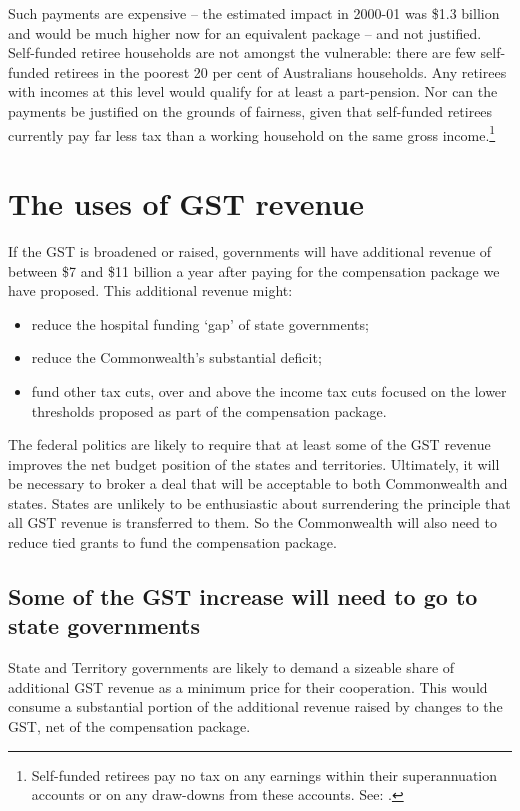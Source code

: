 \documentclass{grattanAlpha}
\begin{document}
Such payments are expensive – the estimated impact in 2000-01 was \$1.3 billion and would be much higher now for an equivalent package – and not justified. Self-funded retiree households are not amongst the vulnerable: there are few self-funded retirees in the poorest 20 per cent of Australians households. Any retirees with incomes at this level would qualify for at least a part-pension. Nor can the payments be justified on the grounds of fairness, given that self-funded retirees currently pay far less tax than a working household on the same gross income.\footnote{Self-funded retirees pay no tax on any earnings within their superannuation accounts or on any draw-downs from these accounts. See: \textcite{DaleyCoatesWoodEtAl2015Super}.}  

\chapter{The uses of GST revenue}\label{chapter:GST-4}
If the GST is broadened or raised, governments will have additional revenue of between \$7 and \$11 billion a year after paying for the compensation package we have proposed. This additional revenue might:
\begin{itemize}
\item	reduce the hospital funding ‘gap’ of state governments;
\item 	reduce the Commonwealth’s substantial deficit; 
\item 	fund other tax cuts, over and above the income tax cuts focused on the lower thresholds proposed as part of the compensation package. 
\end{itemize}
The federal politics are likely to require that at least some of the GST revenue improves the net budget position of the states and territories. Ultimately, it will be necessary to broker a deal that will be acceptable to both Commonwealth and states. States are unlikely to be enthusiastic about surrendering the principle that all GST revenue is transferred to them. So the Commonwealth will also need to reduce tied grants to fund the compensation package. 

\section{Some of the GST increase will need to go to state governments}\label{sec:4-1}
State and Territory governments are likely to demand a sizeable share of additional GST revenue as a minimum price for their cooperation. This would consume a substantial portion of the additional revenue raised by changes to the GST, net of the compensation package.
\end{document}
